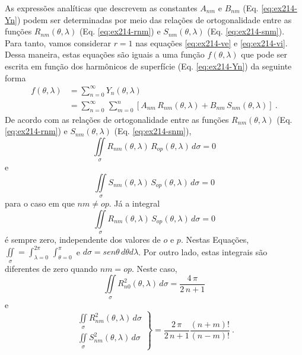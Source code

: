 \documentclass[10pt,a4paper,fleqn]{article}
\begin{document}
As expressões analíticas que descrevem as constantes $A_{nm}$ e $B_{nm}$ (Eq. \ref{eq:ex214-Yn}) 
podem ser determinadas por meio das rela\c{c}\~{o}es de ortogonalidade entre as
fun\c{c}\~{o}es $R_{nm}(\theta, \lambda)$ (Eq. \ref{eq:ex214-rnm}) e $S_{nm}(\theta, \lambda)$ 
(Eq. \ref{eq:ex214-snm}). Para tanto, vamos
considerar $r = 1$ nas equa\c{c}\~{o}es \ref{eq:ex214-ve} e \ref{eq:ex214-vi}. Dessa maneira, estas 
equa\c{c}\~{o}es s\~{a}o iguais a uma fun\c{c}\~{a}o 
$f(\theta,\lambda)$ que pode ser escrita em fun\c{c}\~{a}o dos harm\^{o}nicos de superf\'{i}cie 
(Eq. \ref{eq:ex214-Yn}) da seguinte forma
\begin{equation}
\begin{split}
f(\theta,\lambda) & = \sum_{n=0}^{\infty} 
Y_{n}(\theta, \lambda) \\
& = \sum_{n=0}^{\infty} \,
\sum_{m=0}^{n} \left[ 
A_{nm} \, R_{nm}(\theta, \lambda) +
B_{nm} \, S_{nm}(\theta, \lambda)
\right] \: .
\end{split}
\label{eq:ex214-f}
\end{equation}
De acordo com as rela\c{c}\~{o}es de ortogonalidade entre as fun\c{c}\~{o}es $R_{nm}(\theta, \lambda)$ 
(Eq. \ref{eq:ex214-rnm}) e 
$S_{nm}(\theta, \lambda)$ (Eq. \ref{eq:ex214-snm}),
\begin{equation}
\iint \limits_{\sigma}
R_{nm}(\theta, \lambda) \, R_{op}(\theta, \lambda) \, d \sigma  = 0
\label{eq:ex214-ortog-rnm}
\end{equation}
e
\begin{equation}
\iint \limits_{\sigma}
S_{nm}(\theta, \lambda) \, S_{op}(\theta, \lambda) \, d \sigma = 0
\label{eq:ex214-ortog-snm}
\end{equation}
para o caso em que $nm \neq op$. J\'{a} a integral
\begin{equation}
\iint \limits_{\sigma}
R_{nm}(\theta, \lambda) \, S_{op}(\theta, \lambda) \, d \sigma  = 0
\label{eq:ex214-ortog-rnm-snm}
\end{equation}
\'{e} sempre zero, independente dos valores de $o$ e $p$. Nestas Equa\c{c}\~{o}es, 
$\iint \limits_{\sigma} = \int_{\lambda = 0}^{2\pi} \, \int_{\theta = 0}^{\pi}$ e $d 
\sigma = sen\theta \, d\theta d\lambda$. Por outro lado, estas integrais s\~{a}o diferentes 
de zero quando $nm = op$. Neste caso,
\begin{equation}
\iint \limits_{\sigma}
R_{n0}^{2}(\theta, \lambda) \, d \sigma  = \dfrac{4 \, \pi}{2 \, n + 1}
\label{eq:ex214-ortog-rn02}
\end{equation}
e
\begin{equation}
\left.
\begin{array}{l}
\iint \limits_{\sigma}
R_{nm}^{2}(\theta, \lambda) \, d \sigma \\
\iint \limits_{\sigma}
S_{nm}^{2}(\theta, \lambda) \, d \sigma
\end{array}
\right \} =
\dfrac{2 \, \pi}{2 \, n + 1} \dfrac{(n + m)!}{(n - m)!} \: .
\label{eq:ex214-ortog-rnm2-snm2}
\end{equation}
\end{document}
